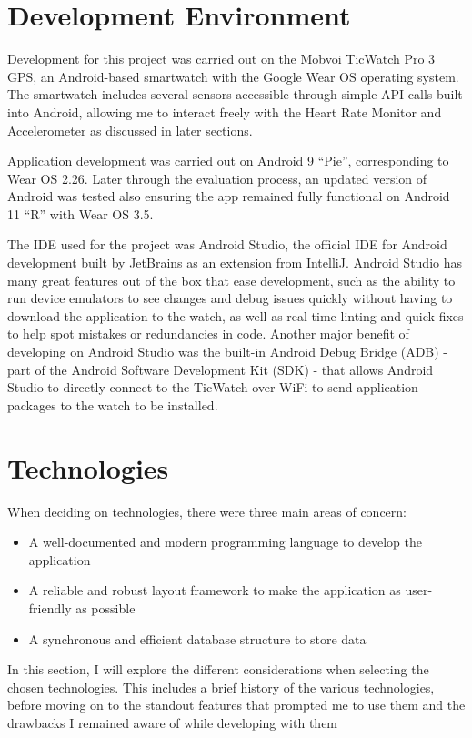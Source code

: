\documentclass{l4proj}
\begin{document}
\section{Development Environment}

Development for this project was carried out on the Mobvoi TicWatch Pro 3 GPS, an Android-based smartwatch with the Google Wear OS operating system. The smartwatch includes several sensors accessible through simple API calls built into Android, allowing me to interact freely with the Heart Rate Monitor and Accelerometer as discussed in later sections. 

Application development was carried out on Android 9 “Pie”, corresponding to Wear OS 2.26. Later through the evaluation process, an updated version of Android was tested also ensuring the app remained fully functional on Android 11 “R” with Wear OS 3.5.

The IDE used for the project was Android Studio, the official IDE for Android development built by JetBrains as an extension from IntelliJ. Android Studio has many great features out of the box that ease development, such as the ability to run device emulators to see changes and debug issues quickly without having to download the application to the watch, as well as real-time linting and quick fixes to help spot mistakes or redundancies in code. Another major benefit of developing on Android Studio was the built-in Android Debug Bridge (ADB) - part of the Android Software Development Kit (SDK) - that allows Android Studio to directly connect to the TicWatch over WiFi to send application packages to the watch to be installed.

\section{Technologies}

When deciding on technologies, there were three main areas of concern:

\begin{itemize}
    \item A well-documented and modern programming language to develop the application
    \item A reliable and robust layout framework to make the application as user-friendly as possible
    \item A synchronous and efficient database structure to store data
\end{itemize}

In this section, I will explore the different considerations when selecting the chosen technologies. This includes a brief history of the various technologies, before moving on to the standout features that prompted me to use them and the drawbacks I remained aware of while developing with them
\end{document}
